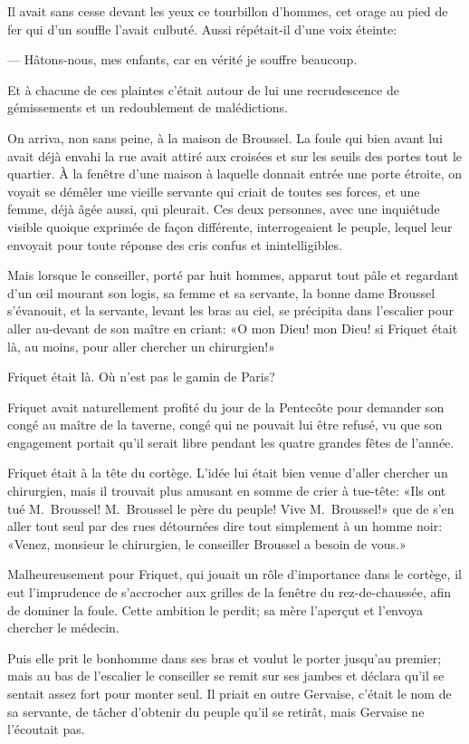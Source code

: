 Il avait sans cesse devant les yeux ce tourbillon d'hommes, cet orage au pied de fer qui d'un souffle l'avait culbuté. Aussi répétait-il d'une voix éteinte:

— Hâtons-nous, mes enfants, car en vérité je souffre beaucoup.

Et à chacune de ces plaintes c'était autour de lui une recrudescence de gémissements et un redoublement de malédictions.

On arriva, non sans peine, à la maison de Broussel. La foule qui bien avant lui avait déjà envahi la rue avait attiré aux croisées et sur les seuils des portes tout le quartier. À la fenêtre d'une maison à laquelle donnait entrée une porte étroite, on voyait se démêler une vieille servante qui criait de toutes ses forces, et une femme, déjà âgée aussi, qui pleurait. Ces deux personnes, avec une inquiétude visible quoique exprimée de façon différente, interrogeaient le peuple, lequel leur envoyait pour toute réponse des cris confus et inintelligibles.

Mais lorsque le conseiller, porté par huit hommes, apparut tout pâle et regardant d'un œil mourant son logis, sa femme et sa servante, la bonne dame Broussel s'évanouit, et la servante, levant les bras au ciel, se précipita dans l'escalier pour aller au-devant de son maître en criant: «O mon Dieu! mon Dieu! si Friquet était là, au moins, pour aller chercher un chirurgien!»

Friquet était là. Où n'est pas le gamin de Paris?

Friquet avait naturellement profité du jour de la Pentecôte pour demander son congé au maître de la taverne, congé qui ne pouvait lui être refusé, vu que son engagement portait qu'il serait libre pendant les quatre grandes fêtes de l'année.

Friquet était à la tête du cortège. L'idée lui était bien venue d'aller chercher un chirurgien, mais il trouvait plus amusant en somme de crier à tue-tête: «Ils ont tué M.~Broussel! M.~Broussel le père du peuple! Vive M.~Broussel!» que de s'en aller tout seul par des rues détournées dire tout simplement à un homme noir: «Venez, monsieur le chirurgien, le conseiller Broussel a besoin de vous.»

Malheureusement pour Friquet, qui jouait un rôle d'importance dans le cortège, il eut l'imprudence de s'accrocher aux grilles de la fenêtre du rez-de-chaussée, afin de dominer la foule. Cette ambition le perdit; sa mère l'aperçut et l'envoya chercher le médecin.

Puis elle prit le bonhomme dans ses bras et voulut le porter jusqu'au premier; mais au bas de l'escalier le conseiller se remit sur ses jambes et déclara qu'il se sentait assez fort pour monter seul. Il priait en outre Gervaise, c'était le nom de sa servante, de tâcher d'obtenir du peuple qu'il se retirât, mais Gervaise ne l'écoutait pas.

